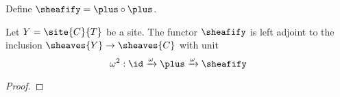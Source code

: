 \begin{definition}
Define $\sheafify = \plus \circ \plus$.
\end{definition}

\begin{lemma}
Let $Y=\site{C}{T}$ be a site.
The functor $\sheafify$ is left adjoint to the inclusion $\sheaves{Y} \rightarrow \sheaves{C}$
with unit 
\[\omega^2: \id \xrightarrow{\omega} \plus \xrightarrow{\omega} \sheafify\]
\end{lemma}

\begin{proof}
\end{proof}

